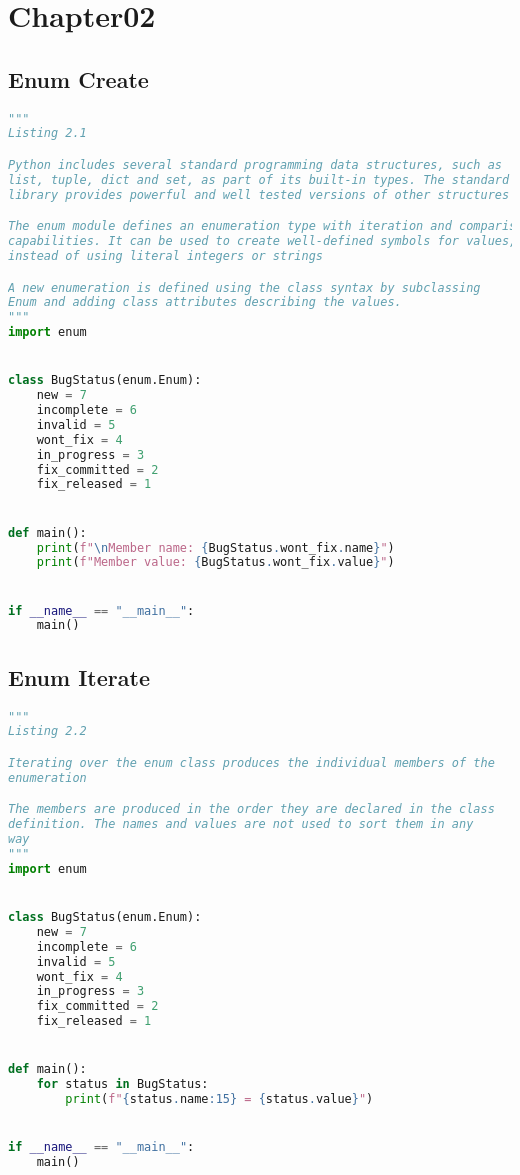 \documentclass[a4paper,landscape]{report}
\begin{document}
\chapter{Chapter02}
\section{Enum Create}
\begin{lstlisting}[language=Python]
"""
Listing 2.1

Python includes several standard programming data structures, such as
list, tuple, dict and set, as part of its built-in types. The standard
library provides powerful and well tested versions of other structures

The enum module defines an enumeration type with iteration and comparison
capabilities. It can be used to create well-defined symbols for values,
instead of using literal integers or strings

A new enumeration is defined using the class syntax by subclassing
Enum and adding class attributes describing the values.
"""
import enum


class BugStatus(enum.Enum):
    new = 7
    incomplete = 6
    invalid = 5
    wont_fix = 4
    in_progress = 3
    fix_committed = 2
    fix_released = 1


def main():
    print(f"\nMember name: {BugStatus.wont_fix.name}")
    print(f"Member value: {BugStatus.wont_fix.value}")


if __name__ == "__main__":
    main()

\end{lstlisting}
\section{Enum Iterate}
\begin{lstlisting}[language=Python]
"""
Listing 2.2

Iterating over the enum class produces the individual members of the
enumeration

The members are produced in the order they are declared in the class
definition. The names and values are not used to sort them in any
way
"""
import enum


class BugStatus(enum.Enum):
    new = 7
    incomplete = 6
    invalid = 5
    wont_fix = 4
    in_progress = 3
    fix_committed = 2
    fix_released = 1


def main():
    for status in BugStatus:
        print(f"{status.name:15} = {status.value}")


if __name__ == "__main__":
    main()

\end{lstlisting}
\end{document}
